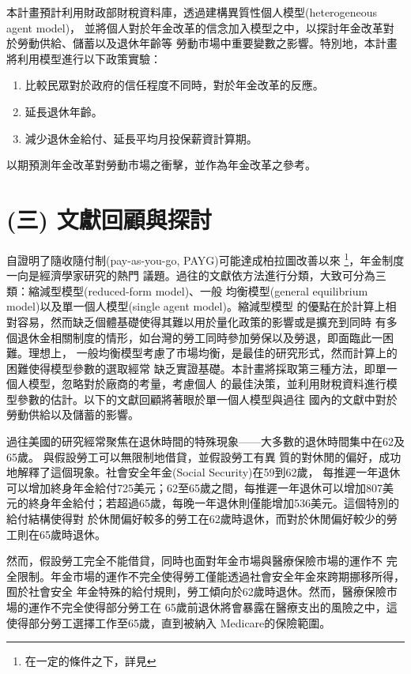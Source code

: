 \documentclass[12pt]{article}
\begin{document}
\begin{CJK*}{UTF8}{bkai}
本計畫預計利用財政部財稅資料庫，透過建構異質性個人模型(heterogeneous agent model)，
並將個人對於年金改革的信念加入模型之中，以探討年金改革對於勞動供給、儲蓄以及退休年齡等
勞動市場中重要變數之影響。特別地，本計畫將利用模型進行以下政策實驗：
\begin{enumerate}
    \item 比較民眾對於政府的信任程度不同時，對於年金改革的反應。
    \item 延長退休年齡。
    \item 減少退休金給付、延長平均月投保薪資計算期。
\end{enumerate}
以期預測年金改革對勞動市場之衝擊，並作為年金改革之參考。

\section*{\normalfont(三) 文獻回顧與探討}

自\cite{samuelson1958}證明了隨收隨付制(pay-as-you-go, PAYG)可能達成柏拉圖改善以來
\footnote{在一定的條件之下，詳見\cite{aaron1966}}，年金制度一向是經濟學家研究的熱門
議題。過往的文獻依方法進行分類，大致可分為三類：縮減型模型(reduced-form model)、一般
均衡模型(general equilibrium model)以及單一個人模型(single agent model)。縮減型模型
的優點在於計算上相對容易，然而缺乏個體基礎使得其難以用於量化政策的影響或是擴充到同時
有多個退休金相關制度的情形，如台灣的勞工同時參加勞保以及勞退，即面臨此一困難。理想上，
一般均衡模型考慮了市場均衡，是最佳的研究形式，然而計算上的困難使得模型參數的選取經常
缺乏實證基礎。本計畫將採取第三種方法，即單一個人模型，忽略對於廠商的考量，考慮個人
的最佳決策，並利用財稅資料進行模型參數的估計。以下的文獻回顧將著眼於單一個人模型與過往
國內的文獻中對於勞動供給以及儲蓄的影響。

過往美國的研究經常聚焦在退休時間的特殊現象——大多數的退休時間集中在62及65歲。
\cite{burtless1986}與\cite{gustman1986}假設勞工可以無限制地借貸，並假設勞工有異
質的對休閒的偏好，成功地解釋了這個現象。社會安全年金(Social Security)在59到62歲，
每推遲一年退休可以增加終身年金給付725美元；62至65歲之間，每推遲一年退休可以增加807美
元的終身年金給付；若超過65歲，每晚一年退休則僅能增加536美元。這個特別的給付結構使得對
於休閒偏好較多的勞工在62歲時退休，而對於休閒偏好較少的勞工則在65歲時退休。

然而，\cite{rust1997}假設勞工完全不能借貸，同時也面對年金市場與醫療保險市場的運作不
完全限制。年金市場的運作不完全使得勞工僅能透過社會安全年金來跨期挪移所得，囿於社會安全
年金特殊的給付規則，勞工傾向於62歲時退休。然而，醫療保險市場的運作不完全使得部分勞工在
65歲前退休將會暴露在醫療支出的風險之中，這使得部分勞工選擇工作至65歲，直到被納入
Medicare的保險範圍。


\end{CJK*}
\end{document}
